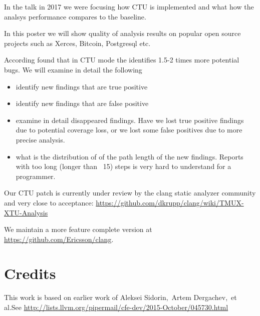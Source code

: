 \documentclass{article}
\begin{document}
In the talk in 2017 we were focusing how CTU is implemented and what how the 
analsys performance compares to the baseline.

In this poster we will show quality of analysis results on popular open source
projects such as Xerces, Bitcoin, Postgresql etc.

According found that in CTU mode the identifies 1.5-2 times more potential bugs.
We will examine in detail the following
\begin{itemize}
\item identify new findings that are true positive
\item identify new findings that are false positive
\item examine in detail disappeared findings. Have we lost true positive findings
due to potential coverage loss, or we lost some false positives due 
to more precise analysis.
\item what is the distribution of of the path length of the new findings. Reports
with too long (longer than ~15) steps is very hard to understand for a programmer.
\end{itemize}

Our CTU patch is currently under review by the clang static analyzer community
and very close to acceptance: \url{https://github.com/dkrupp/clang/wiki/TMUX-XTU-Analysis}

We maintain a more feature complete version at \url{https://github.com/Ericsson/clang}.





\section{Credits}
This work is based on earlier work of Aleksei Sidorin,\ Artem Dergachev,\ 
et al.\@ See \url{http://lists.llvm.org/pipermail/cfe-dev/2015-October/045730.html}
\end{document}
